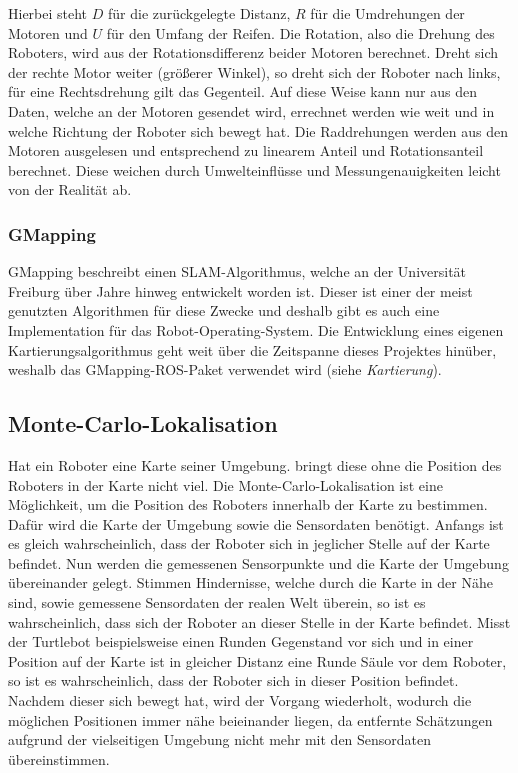 {{{			Hierbei steht $D$ für die zurückgelegte Distanz, $R$ für die Umdrehungen der Motoren und $U$ für den Umfang der Reifen. Die Rotation, also die Drehung des Roboters, wird aus der Rotationsdifferenz beider Motoren berechnet. Dreht sich der rechte Motor weiter (größerer Winkel), so dreht sich der Roboter nach links, für eine Rechtsdrehung gilt das Gegenteil.
			Auf diese Weise kann nur aus den Daten, welche an der Motoren gesendet wird, errechnet werden wie weit und in welche Richtung der Roboter sich bewegt hat.
			Die Raddrehungen werden aus den Motoren ausgelesen und entsprechend zu linearem Anteil und Rotationsanteil berechnet. Diese weichen durch Umwelteinflüsse und Messungenauigkeiten leicht von der Realität ab.
			
			
		\subsubsection{GMapping}
		{
			GMapping beschreibt einen SLAM-Algorithmus, welche an der Universität Freiburg über Jahre hinweg entwickelt worden ist. Dieser ist einer der  meist genutzten Algorithmen für diese Zwecke und deshalb gibt es auch eine Implementation für das Robot-Operating-System. Die Entwicklung eines eigenen Kartierungsalgorithmus geht weit über die Zeitspanne dieses Projektes hinüber, weshalb das GMapping-ROS-Paket verwendet wird (siehe \emph{Kartierung}). \parencite{gmapping} %
			
		}
	}

	\subsection{Monte-Carlo-Lokalisation}
	{ 
		Hat ein Roboter eine Karte seiner Umgebung. bringt diese ohne die Position des Roboters in der Karte nicht viel. Die Monte-Carlo-Lokalisation ist eine Möglichkeit, um die Position des Roboters innerhalb der Karte zu bestimmen.  Dafür wird die Karte der Umgebung sowie die Sensordaten benötigt. Anfangs ist es gleich wahrscheinlich, dass der Roboter sich in jeglicher Stelle auf der Karte befindet. Nun werden die gemessenen Sensorpunkte und die Karte der Umgebung übereinander gelegt. Stimmen Hindernisse, welche durch die Karte in der Nähe sind, sowie gemessene Sensordaten der realen Welt überein, so ist es wahrscheinlich, dass sich der Roboter an dieser Stelle in der Karte befindet. Misst der Turtlebot beispielsweise einen Runden Gegenstand vor sich und in einer Position auf der Karte ist in gleicher Distanz eine Runde Säule vor dem Roboter, so ist es wahrscheinlich, dass der Roboter sich in dieser Position befindet. Nachdem dieser sich bewegt hat, wird der Vorgang wiederholt, wodurch die möglichen Positionen immer nähe beieinander liegen, da entfernte Schätzungen aufgrund der vielseitigen Umgebung nicht mehr mit den Sensordaten übereinstimmen. \parencite{montecarloloc}
	}
}}
